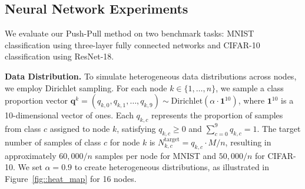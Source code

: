 \documentclass[10pt]{article}
\newcommand{\pushpull}{{\sc Push-Pull}\xspace}
\begin{document}



\subsection{Neural Network Experiments}\label{appendix::exp_mnist}
We evaluate our \pushpull method on two benchmark tasks: MNIST classification using three-layer fully connected networks and CIFAR-10 classification using ResNet-18.

\textbf{Data Distribution.} To simulate heterogeneous data distributions across nodes, we employ Dirichlet sampling. For each node $k \in \{1, \dots, n\}$, we sample a class proportion vector $\mathbf{q}^k = (q_{k,0}, q_{k,1}, \dots, q_{k,9}) \sim \text{Dirichlet}(\alpha \cdot \mathbf{1}^{10})$, where $\mathbf{1}^{10}$ is a 10-dimensional vector of ones. Each $q_{k,c}$ represents the proportion of samples from class $c$ assigned to node $k$, satisfying $q_{k,c}\ge 0$ and $\sum_{c=0}^{9} q_{k,c}=1$. The target number of samples of class $c$ for node $k$ is $N_{k,c}^{\text{target}} = q_{k,c}\cdot M/n$, resulting in approximately $60,000/n$ samples per node for MNIST and $50,000/n$ for CIFAR-10. We set $\alpha = 0.9$ to create heterogeneous distributions, as illustrated in Figure~\ref{fig::heat_map} for 16 nodes.
\end{document}
